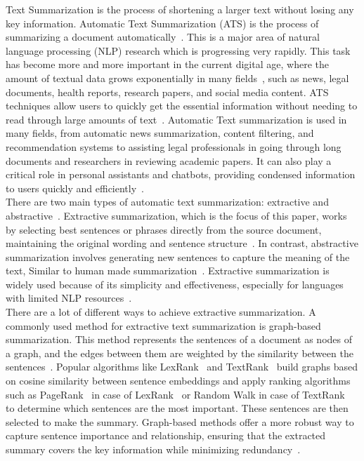 Text Summarization is the process of shortening a larger text without
losing any key information.
Automatic Text Summarization (ATS) is the process of summarizing a document
automatically~\cite{Widyassari-2022-rev-ats-tech-met}.
This is a major area of natural language processing (NLP) research
which is progressing very rapidly.
This task has become more and more important in the current digital age,
where the amount of textual data grows exponentially in many
fields~\cite{2015-Forbes-80-created-last-2-years},
such as news, legal documents, health reports, research papers,
and social media content.
ATS techniques allow users to quickly get the essential information
without needing to read through large amounts of
text~\cite{wafaa-2021-summary-comprehensive-review}.
Automatic Text summarization is used in many fields, from automatic
news summarization, content filtering, and recommendation
systems to assisting legal professionals in going through
long documents and researchers in reviewing academic papers.
It can also play a critical role in personal assistants and chatbots,
providing condensed information to users quickly
and efficiently~\cite{tas-2017-rev-text-sum-2}.\\

There are two main types of automatic text summarization: extractive
and abstractive~\cite{tas-2017-rev-text-sum-2}.
Extractive summarization, which is the focus of this paper, works by
selecting best sentences or phrases directly
from the source document, maintaining the original wording and
sentence structure~\cite{moratanch-2017-extractive-review}.
In contrast, abstractive summarization involves generating new
sentences to capture the meaning of the text, Similar to human made
summarization~\cite{Moratanch-2016-abstractive-rev}.
Extractive summarization is widely used because of its
simplicity and effectiveness, especially for languages with
limited NLP resources~\cite{gupta-2010-extractive-rev}.\\

There are a lot of different ways to achieve extractive summarization.
A commonly used method for extractive text summarization
is graph-based summarization.
This method represents the sentences of a document as
nodes of a graph, and the edges between them are weighted by the
similarity between the sentences~\cite{wafaa-2021-summary-comprehensive-review}.
Popular algorithms like LexRank~\cite{Erkan-lexRank-2004}
and TextRank~\cite{mihalcea-2004-textrank} build graphs based
on cosine similarity between sentence embeddings and
apply ranking algorithms such as PageRank~\cite{page-PageRank-1999} in
case of LexRank~\cite{Erkan-lexRank-2004} or Random
Walk in case of TextRank~\cite{mihalcea-2004-textrank} to
determine which sentences are the most important.
These sentences are then selected to make the summary.
Graph-based methods offer a more robust way to capture
sentence importance and relationship, ensuring that the
extracted summary covers the key information while
minimizing redundancy~\cite{wafaa-2021-summary-comprehensive-review}.\\

